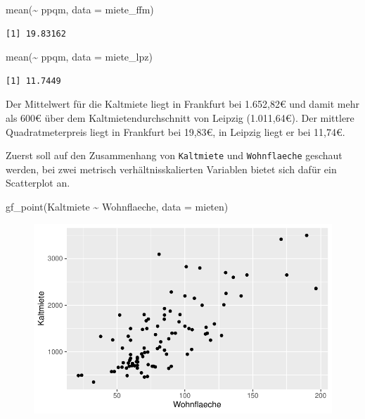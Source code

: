 \documentclass[
  a4paper,
  DIV=11]{scrartcl}
\newenvironment{Shaded}{\begin{snugshade}}{\end{snugshade}}
\newcommand{\AttributeTok}[1]{\textcolor[rgb]{0.40,0.45,0.13}{#1}}
\newcommand{\FunctionTok}[1]{\textcolor[rgb]{0.28,0.35,0.67}{#1}}
\newcommand{\NormalTok}[1]{\textcolor[rgb]{0.00,0.23,0.31}{#1}}
\newcommand{\SpecialCharTok}[1]{\textcolor[rgb]{0.37,0.37,0.37}{#1}}
\begin{document}
\begin{Shaded}
\begin{Highlighting}[]
\FunctionTok{mean}\NormalTok{(}\SpecialCharTok{\textasciitilde{}}\NormalTok{ ppqm, }\AttributeTok{data =}\NormalTok{ miete\_ffm)}
\end{Highlighting}
\end{Shaded}

\begin{verbatim}
[1] 19.83162
\end{verbatim}

\begin{Shaded}
\begin{Highlighting}[]
\FunctionTok{mean}\NormalTok{(}\SpecialCharTok{\textasciitilde{}}\NormalTok{ ppqm, }\AttributeTok{data =}\NormalTok{ miete\_lpz)}
\end{Highlighting}
\end{Shaded}

\begin{verbatim}
[1] 11.7449
\end{verbatim}

Der Mittelwert für die Kaltmiete liegt in Frankfurt bei 1.652,82€ und
damit mehr als 600€ über dem Kaltmietendurchschnitt von Leipzig
(1.011,64€). Der mittlere Quadratmeterpreis liegt in Frankfurt bei
19,83€, in Leipzig liegt er bei 11,74€.

Zuerst soll auf den Zusammenhang von \texttt{Kaltmiete} und
\texttt{Wohnflaeche} geschaut werden, bei zwei metrisch
verhältnisskalierten Variablen bietet sich dafür ein Scatterplot an.

\begin{Shaded}
\begin{Highlighting}[]
\FunctionTok{gf\_point}\NormalTok{(Kaltmiete }\SpecialCharTok{\textasciitilde{}}\NormalTok{ Wohnflaeche, }\AttributeTok{data =}\NormalTok{ mieten)}
\end{Highlighting}
\end{Shaded}

\begin{figure}[H]

{\centering \includegraphics{Mietmodellierung_files/figure-pdf/unnamed-chunk-7-1.pdf}

}

\end{figure}
\end{document}
